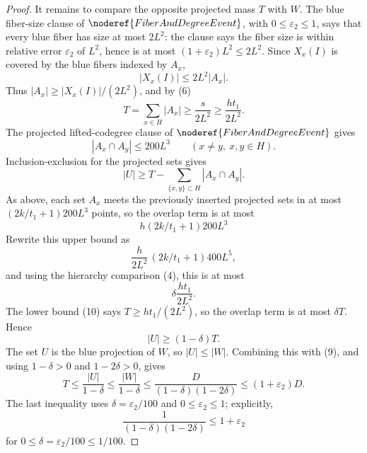 \begin{proof}
It remains to compare the opposite projected mass \(T\) with \(W\).  The blue
fiber-size clause of \(\noderef{FiberAndDegreeEvent}\), with
\(0\le\varepsilon_2\le1\), says that every blue fiber has size at most
\(2L^2\): the clause says the fiber size is within relative error
\(\varepsilon_2\) of \(L^2\), hence is at most
\((1+\varepsilon_2)L^2\le2L^2\).  Since \(X_x(I)\) is covered by the blue
fibers indexed by \(A_x\),
\[
|X_x(I)|\le 2L^2|A_x|.
\]
Thus \(|A_x|\ge |X_x(I)|/(2L^2)\), and by (6)
\[
T=\sum_{x\in H}|A_x|\ge \frac{s}{2L^2}\ge \frac{h t_1}{2L^2}. \tag{10}
\]
The projected lifted-codegree clause of \(\noderef{FiberAndDegreeEvent}\)
gives
\[
|A_x\cap A_y|\le200L^3
\qquad(x\ne y,\ x,y\in H).
\]
Inclusion-exclusion for the projected sets gives
\[
|U|\ge T-\sum_{\{x,y\}\subset H}|A_x\cap A_y|.
\]
As above, each set \(A_x\) meets the previously inserted projected sets in at
most \((2k/t_1+1)200L^3\) points, so the overlap term is at most
\[
h(2k/t_1+1)200L^3
\]
Rewrite this upper bound as
\[
\frac{h}{2L^2}\,(2k/t_1+1)400L^5,
\]
and using the hierarchy comparison (4), this is at most
\[
\delta\frac{h t_1}{2L^2}.
\]
The lower bound (10) says \(T\ge h t_1/(2L^2)\), so the overlap term is at
most \(\delta T\).  Hence
\[
|U|\ge(1-\delta)T.
\]
The set \(U\) is the blue projection of \(W\), so \(|U|\le |W|\).  Combining
this with (9), and using \(1-\delta>0\) and \(1-2\delta>0\), gives
\[
T\le\frac{|U|}{1-\delta}
\le\frac{|W|}{1-\delta}
\le\frac{D}{(1-\delta)(1-2\delta)}
\le(1+\varepsilon_2)D. \tag{11}
\]
The last inequality uses \(\delta=\varepsilon_2/100\) and
\(0\le\varepsilon_2\le1\); explicitly,
\[
\frac{1}{(1-\delta)(1-2\delta)}\le1+\varepsilon_2
\]
for \(0\le\delta=\varepsilon_2/100\le1/100\).


\end{proof}
